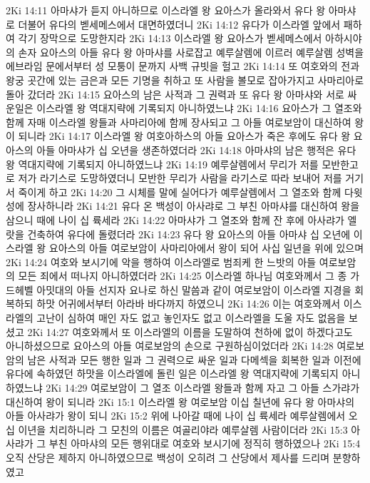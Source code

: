 2Ki 14:11  아마샤가 듣지 아니하므로 이스라엘 왕 요아스가 올라와서 유다 왕 아마샤로 더불어 유다의 벧세메스에서 대면하였더니
2Ki 14:12  유다가 이스라엘 앞에서 패하여 각기 장막으로 도망한지라
2Ki 14:13  이스라엘 왕 요아스가 벧세메스에서 아하시야의 손자 요아스의 아들 유다 왕 아마샤를 사로잡고 예루살렘에 이르러 예루살렘 성벽을 에브라임 문에서부터 성 모퉁이 문까지 사백 규빗을 헐고
2Ki 14:14  또 여호와의 전과 왕궁 곳간에 있는 금은과 모든 기명을 취하고 또 사람을 볼모로 잡아가지고 사마리아로 돌아 갔더라
2Ki 14:15  요아스의 남은 사적과 그 권력과 또 유다 왕 아마샤와 서로 싸운일은 이스라엘 왕 역대지략에 기록되지 아니하였느냐
2Ki 14:16  요아스가 그 열조와 함께 자매 이스라엘 왕들과 사마리아에 함께 장사되고 그 아들 여로보암이 대신하여 왕이 되니라
2Ki 14:17  이스라엘 왕 여호아하스의 아들 요아스가 죽은 후에도 유다 왕 요아스의 아들 아마샤가 십 오년을 생존하였더라
2Ki 14:18  아마샤의 남은 행적은 유다 왕 역대지략에 기록되지 아니하였느냐
2Ki 14:19  예루살렘에서 무리가 저를 모반한고로 저가 라기스로 도망하였더니 모반한 무리가 사람을 라기스로 따라 보내어 저를 거기서 죽이게 하고
2Ki 14:20  그 시체를 말에 실어다가 예루살렘에서 그 열조와 함께 다윗성에 장사하니라
2Ki 14:21  유다 온 백성이 아사랴로 그 부친 아마샤를 대신하여 왕을 삼으니 때에 나이 십 륙세라
2Ki 14:22  아마샤가 그 열조와 함께 잔 후에 아사랴가 엘랏을 건축하여 유다에 돌렸더라
2Ki 14:23  유다 왕 요아스의 아들 아마샤 십 오년에 이스라엘 왕 요아스의 아들 여로보암이 사마리아에서 왕이 되어 사십 일년을 위에 있으며
2Ki 14:24  여호와 보시기에 악을 행하여 이스라엘로 범죄케 한 느밧의 아들 여로보암의 모든 죄에서 떠나지 아니하였더라
2Ki 14:25  이스라엘 하나님 여호와께서 그 종 가드헤벨 아밋대의 아들 선지자 요나로 하신 말씀과 같이 여로보암이 이스라엘 지경을 회복하되 하맛 어귀에서부터 아라바 바다까지 하였으니
2Ki 14:26  이는 여호와께서 이스라엘의 고난이 심하여 매인 자도 없고 놓인자도 없고 이스라엘을 도울 자도 없음을 보셨고
2Ki 14:27  여호와께서 또 이스라엘의 이름을 도말하여 천하에 없이 하겠다고도 아니하셨으므로 요아스의 아들 여로보암의 손으로 구원하심이었더라
2Ki 14:28  여로보암의 남은 사적과 모든 행한 일과 그 권력으로 싸운 일과 다메섹을 회복한 일과 이전에 유다에 속하였던 하맛을 이스라엘에 돌린 일은 이스라엘 왕 역대지략에 기록되지 아니하였느냐
2Ki 14:29  여로보암이 그 열조 이스라엘 왕들과 함께 자고 그 아들 스가랴가 대신하여 왕이 되니라
2Ki 15:1  이스라엘 왕 여로보암 이십 칠년에 유다 왕 아마샤의 아들 아사랴가 왕이 되니
2Ki 15:2  위에 나아갈 때에 나이 십 륙세라 예루살렘에서 오십 이년을 치리하니라 그 모친의 이름은 여골리야라 예루살렘 사람이더라
2Ki 15:3  아사랴가 그 부친 아마샤의 모든 행위대로 여호와 보시기에 정직히 행하였으나
2Ki 15:4  오직 산당은 제하지 아니하였으므로 백성이 오히려 그 산당에서 제사를 드리며 분향하였고
